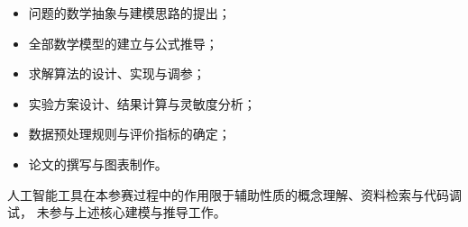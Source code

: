 \documentclass[bwprint]{gmcmthesis}
\numberwithin{equation}{section}
\numberwithin{figure}{section}
\numberwithin{table}{section}
\begin{document}
\begin{appendices}
\begin{itemize}
  \item 问题的数学抽象与建模思路的提出；
  \item 全部数学模型的建立与公式推导；
  \item 求解算法的设计、实现与调参；
  \item 实验方案设计、结果计算与灵敏度分析；
  \item 数据预处理规则与评价指标的确定；
  \item 论文的撰写与图表制作。
\end{itemize}

人工智能工具在本参赛过程中的作用限于辅助性质的概念理解、资料检索与代码调试，
未参与上述核心建模与推导工作。

\end{appendices}
\end{document}
